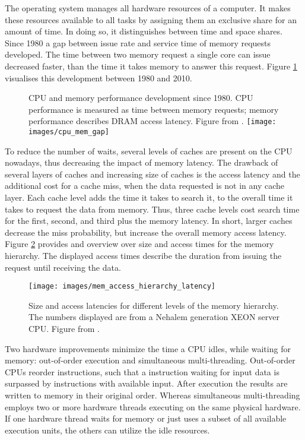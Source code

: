 The operating system manages all hardware resources of a computer.
It makes these resources available to all tasks by assigning them an exclusive
share for an amount of time.
In doing so, it distinguishes between time and space shares.
Since 1980 a gap between issue rate and service time of memory requests
developed.
The time between two memory request a single core can issue decreased faster, than
the time it takes memory to answer this request.
Figure \ref{intro:fig:cpuMemGap} visualises this development between 1980 and
2010.
%
\begin{figure}[h]
  \setcapindent*{1em}
  \begin{captionbeside}[]{CPU and memory performance development since 1980.
      CPU performance is measured as time between memory requests; memory
      performance describes DRAM access latency.
      Figure from \cite[73]{hennessy_computer_2012}.}
    \texttt{[image: images/cpu\_mem\_gap]}
  \end{captionbeside}
  \label{intro:fig:cpuMemGap}
\end{figure}
%
To reduce the number of waits, several levels of caches are present on the CPU
nowadays, thus decreasing the impact of memory latency.
The drawback of several layers of caches and increasing size of caches is the
access latency and the additional cost for a cache miss, when the data
requested is not in any cache layer.
Each cache level adds the time it takes to search it, to the overall
time it takes to request the data from memory.
Thus, three cache levels cost search time for the first, second, and third plus
the memory latency.
In short, larger caches decrease the miss probability, but increase the overall
memory access latency.
Figure \ref{into:fig:accessLatencies} provides and overview over size and
access times for the memory hierarchy.
The displayed access times describe the duration from issuing the request until
receiving the data.
%
\begin{figure}[h]
  \texttt{[image: images/mem\_access\_hierarchy\_latency]}
  \caption{Size and access latencies for different levels of the
    memory hierarchy.
    The numbers displayed are from a Nehalem generation XEON server CPU.
    Figure from \cite[72]{hennessy_computer_2012}.}
  \label{into:fig:accessLatencies}
\end{figure}

Two hardware improvements minimize the time a CPU idles, while waiting for
memory: out-of-order execution and simultaneous multi-threading.
Out-of-order CPUs reorder instructions, such that a instruction waiting for
input data is surpassed by instructions with available input.
After execution the results are written to memory in their original order.
Whereas simultaneous multi-threading employs two or more hardware threads
executing on the same physical hardware.
If one hardware thread waits for memory or just uses a subset of all available
execution units, the others can utilize the idle resources.

